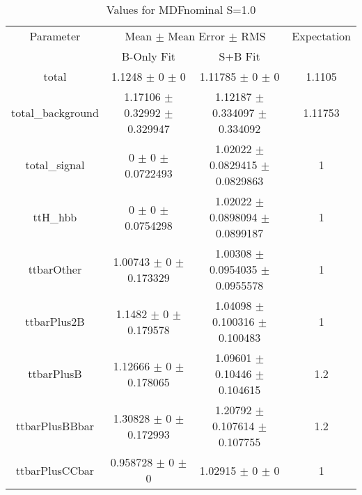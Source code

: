 \begin{table}
\centering
\caption{Values for MDFnominal S=1.0}
\begin{tabular}{cccc}
\toprule
Parameter & \multicolumn{2}{c}{Mean $\pm$ Mean Error $\pm$ RMS} & Expectation\\
 & B-Only Fit & S+B Fit & \\
\midrule
total & \num{1.1248} $\pm$ \num{0} $\pm$ \num{0} & \num{1.11785} $\pm$ \num{0} $\pm$ \num{0} & \num{1.1105}\\
total\_background & \num{1.17106} $\pm$ \num{0.32992} $\pm$ \num{0.329947} & \num{1.12187} $\pm$ \num{0.334097} $\pm$ \num{0.334092} & \num{1.11753}\\
total\_signal & \num{0} $\pm$ \num{0} $\pm$ \num{0.0722493} & \num{1.02022} $\pm$ \num{0.0829415} $\pm$ \num{0.0829863} & \num{1}\\
ttH\_hbb & \num{0} $\pm$ \num{0} $\pm$ \num{0.0754298} & \num{1.02022} $\pm$ \num{0.0898094} $\pm$ \num{0.0899187} & \num{1}\\
ttbarOther & \num{1.00743} $\pm$ \num{0} $\pm$ \num{0.173329} & \num{1.00308} $\pm$ \num{0.0954035} $\pm$ \num{0.0955578} & \num{1}\\
ttbarPlus2B & \num{1.1482} $\pm$ \num{0} $\pm$ \num{0.179578} & \num{1.04098} $\pm$ \num{0.100316} $\pm$ \num{0.100483} & \num{1}\\
ttbarPlusB & \num{1.12666} $\pm$ \num{0} $\pm$ \num{0.178065} & \num{1.09601} $\pm$ \num{0.10446} $\pm$ \num{0.104615} & \num{1.2}\\
ttbarPlusBBbar & \num{1.30828} $\pm$ \num{0} $\pm$ \num{0.172993} & \num{1.20792} $\pm$ \num{0.107614} $\pm$ \num{0.107755} & \num{1.2}\\
ttbarPlusCCbar & \num{0.958728} $\pm$ \num{0} $\pm$ \num{0} & \num{1.02915} $\pm$ \num{0} $\pm$ \num{0} & \num{1}\\
\bottomrule
\end{tabular}
\end{table}